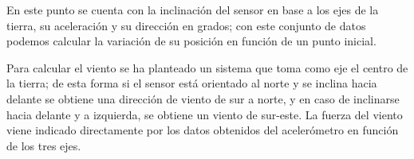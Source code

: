  En este punto se cuenta con la inclinación del sensor en base a los ejes de la tierra, su aceleración y su dirección en grados; con este conjunto de datos podemos calcular la variación de su posición en función de un punto inicial.
   
  Para calcular el viento se ha planteado un sistema que toma como eje el centro de la tierra; de esta forma si el sensor está orientado al norte y se inclina hacia delante se obtiene una dirección de viento de sur a norte, y en caso de inclinarse hacia delante y a izquierda, se obtiene un viento de sur-este. La fuerza del viento viene indicado directamente por los datos obtenidos del acelerómetro en función de los tres ejes.
  
  